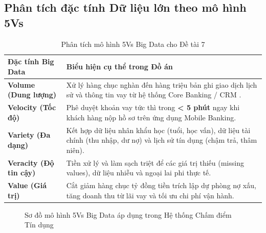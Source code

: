 \begin{itemize}
\section{Phân tích đặc tính Dữ liệu lớn theo mô hình 5Vs}
\begin{table}[h!]
\centering
\caption{Phân tích mô hình 5Vs Big Data cho Đề tài 7}
\label{tab:5vs_analysis}
\begin{tabularx}{\textwidth}{|l|X|}
\hline
\textbf{Đặc tính Big Data} & \textbf{Biểu hiện cụ thể trong Đồ án} \\ \hline
\textbf{Volume (Dung lượng)} & Xử lý hàng chục nghàn đến hàng triệu bản ghi giao dịch lịch sử và thông tin vay từ hệ thống Core Banking / CRM \cite{uwais2021}. \\ \hline
\textbf{Velocity (Tốc độ)} & Phê duyệt khoản vay tức thì trong \textbf{< 5 phút} ngay khi khách hàng nộp hồ sơ trên ứng dụng Mobile Banking. \\ \hline
\textbf{Variety (Đa dạng)} & Kết hợp dữ liệu nhân khẩu học (tuổi, học vấn), dữ liệu tài chính (thu nhập, dư nợ) và lịch sử tín dụng (chậm trả, thâm niên). \\ \hline
\textbf{Veracity (Độ tin cậy)} & Tiền xử lý và làm sạch triệt để các giá trị thiếu (missing values), dữ liệu nhiễu và ngoại lai phi thực tế. \\ \hline
\textbf{Value (Giá trị)} & Cắt giảm hàng chục tỷ đồng tiền trích lập dự phòng nợ xấu, tăng doanh thu từ lãi vay và tối ưu chi phí vận hành. \\ \hline
\end{tabularx}
\end{table}

\begin{figure}[h!]
\centering
\caption{Sơ đồ mô hình 5Vs Big Data áp dụng trong Hệ thống Chấm điểm Tín dụng}
\label{fig:sodo_5vs}
\end{figure}


\end{itemize}
